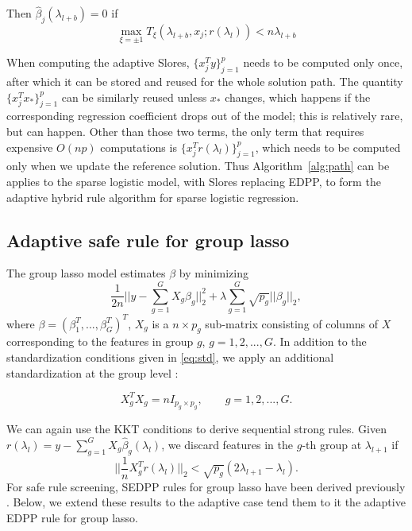 \begin{theorem}
Then $\hat{\beta}_j(\lambda_{l+b})=0$ if
  \begin{equation}
    \max_{\xi=\pm1} T_\xi(\lambda_{l+b},x_j;r(\lambda_l))<n\lambda_{l+b}
  \end{equation}
\end{theorem}

When computing the adaptive Slores, $\{x_j^Ty\}_{j=1}^p$ needs to be computed only once, after which it can be stored and reused for the whole solution path. The quantity $\{x_j^Tx_*\}_{j=1}^p$ can be similarly reused unless $x_*$ changes, which happens if the corresponding regression coefficient drops out of the model; this is relatively rare, but can happen. Other than those two terms, the only term that requires expensive $O(np)$ computations is $\{x_j^Tr(\lambda_l)\}_{j=1}^p$, which needs to be computed only when we update the reference solution. Thus Algorithm~\ref{alg:path} can be applies to the sparse logistic model, with Slores replacing EDPP, to form the adaptive hybrid rule algorithm for sparse logistic regression.

\subsection{Adaptive safe rule for group lasso}
\label{sec:group}

The group lasso model \citep{yuan2006model} estimates $\beta$ by minimizing
\begin{equation}
    \label{eq:glasso}
    \frac{1}{2n}\bigg|\bigg|y - \sum_{g=1}^GX_g\beta_g\bigg|\bigg|_2^2 + \lambda\sum_{g=1}^G\sqrt{p_g}||\beta_g||_2,
\end{equation}
where $\beta=(\beta_1^T,...,\beta_G^T)^T$, $X_g$ is a $n\times p_g$ sub-matrix consisting of columns of $X$ corresponding to the features in group $g$, $g=1,2,...,G$. In addition to the standardization conditions given in \eqref{eq:std}, we apply an additional standardization at the group level \citep{breheny2015group}:

\begin{equation}
    \label{eq:stdg}
    X_g^TX_g=nI_{p_g\times p_g},\qquad g=1,2,...,G.
\end{equation}

We can again use the KKT conditions to derive sequential strong rules. Given $r(\lambda_l)=y-\sum_{g=1}^GX_g\hat{\beta}_g(\lambda_l)$, we discard features in the $g$-th group at $\lambda_{l+1}$ if
\begin{equation} \bigg|\bigg|\frac{1}{n}X_g^Tr(\lambda_l)\bigg|\bigg|_2<\sqrt{p_g}(2\lambda_{l+1}-\lambda_l).
\end{equation}
For safe rule screening, SEDPP rules for group lasso have been derived previously \citep{wang2013lasso}. Below, we extend these results to the adaptive case tend them to it the adaptive EDPP rule for group lasso.

